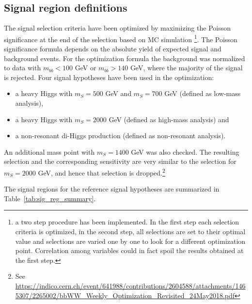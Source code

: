 \subsection{Signal region definitions}
\label{subsec:SR}
The signal selection criteria have been optimized by maximizing the Poisson significance at the end of the selection based on MC simulation \footnote{a two step procedure has been implemented. In the first step each selection criteria is optimized, in the second step, all selections are set to their optimal value and selections are varied one by one to
look for a different optimization point. Correlation among variables could in fact spoil the results obtained at the first step.}. The Poisson significance formula depends on the absolute yield of expected signal and
background events. For the optimization formula the \ttbar background was
normalized to data with $m_{bb} < 100$ GeV or $m_{bb} > 140$ GeV, where the majority of the signal is rejected. Four signal
hypotheses have been used in the optimization:
\begin{itemize}
\item{ a heavy Higgs with $m_S = 500$ GeV and $m_S = 700$ GeV (defined as low-mass analysis)},
\item{ a heavy Higgs with $m_S = 2000$ GeV (defined as high-mass analysis) and}
\item{ a non-resonant di-Higgs production (defined as non-resonant analysis).}
\end{itemize}
An additional mass point with $m_S = 1400$ GeV was also checked. The resulting selection and the corresponding sensitivity are very similar to the selection for $m_S = 2000$ GeV, and hence that selection is dropped.{\footnote {See \url {https://indico.cern.ch/event/641988/contributions/2604588/attachments/1465307/2265002/bbWW_Weekly_Optimization_Revisited_24May2018.pdf}}} 

The signal regions for the  reference signal hypotheses are summarized in 
Table~\ref{tab:sig_reg_summary}.



